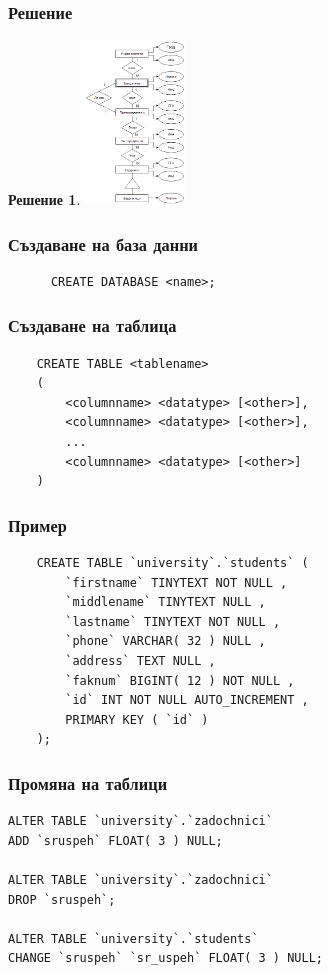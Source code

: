\documentclass{beamer}
\newtheorem{solv}{Решение}
\begin{document}
  \begin{frame}
    \frametitle{Решение}
    \begin{solv}
      \includegraphics[width=100px]{img/problem1}
    \end{solv}
  \end{frame}

\begin{frame}[fragile]
\frametitle{Създаване на база данни}
\begin{block}{}
\begin{lstlisting}
      CREATE DATABASE <name>;
\end{lstlisting}
\end{block}
\end{frame}

\begin{frame}[fragile]
\frametitle{Създаване на таблица}
\begin{block}{}
\begin{lstlisting}
    CREATE TABLE <tablename>
    (
        <columnname> <datatype> [<other>],
        <columnname> <datatype> [<other>],
        ...
        <columnname> <datatype> [<other>]
    )
\end{lstlisting}
\end{block}
\end{frame}

\begin{frame}[fragile]
\frametitle{Пример}
\begin{block}{}
\begin{lstlisting}
	CREATE TABLE `university`.`students` (
		`firstname` TINYTEXT NOT NULL ,
		`middlename` TINYTEXT NULL ,
		`lastname` TINYTEXT NOT NULL ,
		`phone` VARCHAR( 32 ) NULL ,
		`address` TEXT NULL ,
		`faknum` BIGINT( 12 ) NOT NULL ,
		`id` INT NOT NULL AUTO_INCREMENT ,
		PRIMARY KEY ( `id` )
	);
\end{lstlisting}
\end{block}
\end{frame}

\begin{frame}[fragile]
\frametitle{Промяна на таблици}
\begin{block}{}
\begin{lstlisting}
ALTER TABLE `university`.`zadochnici`
ADD `sruspeh` FLOAT( 3 ) NULL;

ALTER TABLE `university`.`zadochnici`
DROP `sruspeh`;

ALTER TABLE `university`.`students`
CHANGE `sruspeh` `sr_uspeh` FLOAT( 3 ) NULL;
\end{lstlisting}
\end{block}
\end{frame}
 
  
\end{document}

